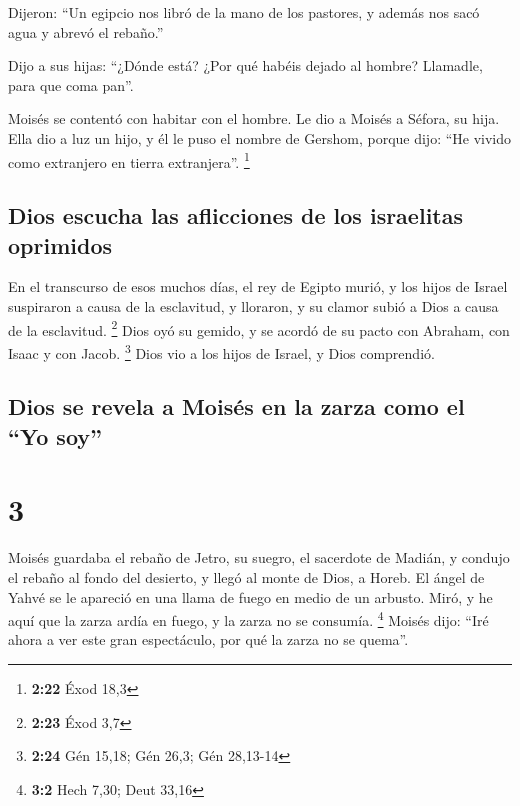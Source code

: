  Dijeron: ``Un egipcio nos libró de la mano de los
pastores, y además nos sacó agua y abrevó el rebaño.''

 Dijo a sus hijas: ``¿Dónde está? ¿Por qué habéis dejado
al hombre? Llamadle, para que coma pan''.

 Moisés se contentó con habitar con el hombre. Le dio a
Moisés a Séfora, su hija.  Ella dio a luz un hijo, y él
le puso el nombre de Gershom, porque dijo: ``He vivido como extranjero
en tierra extranjera''. \footnote{\textbf{2:22} Éxod 18,3}

\hypertarget{dios-escucha-las-aflicciones-de-los-israelitas-oprimidos}{%
\subsection{Dios escucha las aflicciones de los israelitas
oprimidos}\label{dios-escucha-las-aflicciones-de-los-israelitas-oprimidos}}

 En el transcurso de esos muchos días, el rey de Egipto
murió, y los hijos de Israel suspiraron a causa de la esclavitud, y
lloraron, y su clamor subió a Dios a causa de la esclavitud. \footnote{\textbf{2:23}
  Éxod 3,7}  Dios oyó su gemido, y se acordó de su pacto
con Abraham, con Isaac y con Jacob. \footnote{\textbf{2:24} Gén 15,18;
  Gén 26,3; Gén 28,13-14}  Dios vio a los hijos de
Israel, y Dios comprendió.

\hypertarget{dios-se-revela-a-moisuxe9s-en-la-zarza-como-el-yo-soy}{%
\subsection{Dios se revela a Moisés en la zarza como el ``Yo
soy''}\label{dios-se-revela-a-moisuxe9s-en-la-zarza-como-el-yo-soy}}

\hypertarget{section-2}{%
\section{3}\label{section-2}}

 Moisés guardaba el rebaño de Jetro, su suegro, el
sacerdote de Madián, y condujo el rebaño al fondo del desierto, y llegó
al monte de Dios, a Horeb.  El ángel de Yahvé se le
apareció en una llama de fuego en medio de un arbusto. Miró, y he aquí
que la zarza ardía en fuego, y la zarza no se consumía. \footnote{\textbf{3:2}
  Hech 7,30; Deut 33,16}  Moisés dijo: ``Iré ahora a ver
este gran espectáculo, por qué la zarza no se quema''.

